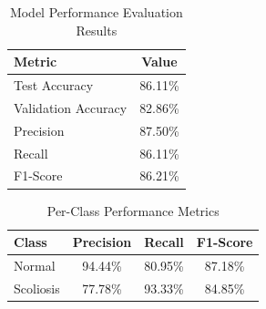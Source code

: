 
\begin{table}[h]
\centering
\caption{Model Performance Evaluation Results}
\label{tab:model_performance}
\begin{tabular}{l|c}
\hline
\textbf{Metric} & \textbf{Value} \\
\hline
Test Accuracy & 86.11\% \\
Validation Accuracy & 82.86\% \\
Precision & 87.50\% \\
Recall & 86.11\% \\
F1-Score & 86.21\% \\
\hline
\end{tabular}
\end{table}

\begin{table}[h]
\centering
\caption{Per-Class Performance Metrics}
\label{tab:per_class_metrics}
\begin{tabular}{l|c|c|c}
\hline
\textbf{Class} & \textbf{Precision} & \textbf{Recall} & \textbf{F1-Score} \\
\hline
Normal & 94.44\% & 80.95\% & 87.18\% \\
Scoliosis & 77.78\% & 93.33\% & 84.85\% \\
\hline
\end{tabular}
\end{table}
